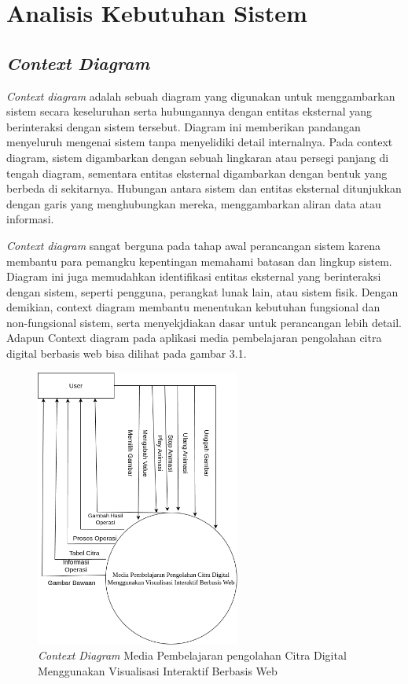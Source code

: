 \section{Analisis Kebutuhan Sistem}
\subsection{\textit{Context Diagram}}

\textit{Context diagram} adalah sebuah diagram yang digunakan untuk menggambarkan sistem secara keseluruhan serta hubungannya dengan entitas eksternal yang berinteraksi dengan sistem tersebut. Diagram ini memberikan pandangan menyeluruh mengenai sistem tanpa menyelidiki detail internalnya. Pada context diagram, sistem digambarkan dengan sebuah lingkaran atau persegi panjang di tengah diagram, sementara entitas eksternal digambarkan dengan bentuk yang berbeda di sekitarnya. Hubungan antara sistem dan entitas eksternal ditunjukkan dengan garis yang menghubungkan mereka, menggambarkan aliran data atau informasi.

\textit{Context diagram} sangat berguna pada tahap awal perancangan sistem karena membantu para pemangku kepentingan memahami batasan dan lingkup sistem. Diagram ini juga memudahkan identifikasi entitas eksternal yang berinteraksi dengan sistem, seperti pengguna, perangkat lunak lain, atau sistem fisik. Dengan demikian, context diagram membantu menentukan kebutuhan fungsional dan non-fungsional sistem, serta menyekjdiakan dasar untuk perancangan lebih detail. Adapun Context diagram pada aplikasi media pembelajaran pengolahan citra digital berbasis web bisa dilihat pada gambar 3.1.

          \begin{figure}[ht]
    	      \includegraphics[width=0.6\textwidth, center]{images/diagram-konteks.png}
              \caption{\textit{Context Diagram} Media Pembelajaran pengolahan Citra Digital Menggunakan Visualisasi Interaktif Berbasis Web}
          \end{figure}

